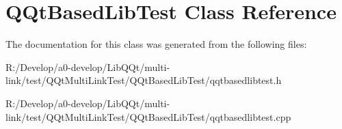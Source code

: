 \hypertarget{class_q_qt_based_lib_test}{}\section{Q\+Qt\+Based\+Lib\+Test Class Reference}
\label{class_q_qt_based_lib_test}


The documentation for this class was generated from the following files\+:\begin{DoxyCompactItemize}
\item 
R\+:/\+Develop/a0-\/develop/\+Lib\+Q\+Qt/multi-\/link/test/\+Q\+Qt\+Multi\+Link\+Test/\+Q\+Qt\+Based\+Lib\+Test/qqtbasedlibtest.\+h\item 
R\+:/\+Develop/a0-\/develop/\+Lib\+Q\+Qt/multi-\/link/test/\+Q\+Qt\+Multi\+Link\+Test/\+Q\+Qt\+Based\+Lib\+Test/qqtbasedlibtest.\+cpp\end{DoxyCompactItemize}
